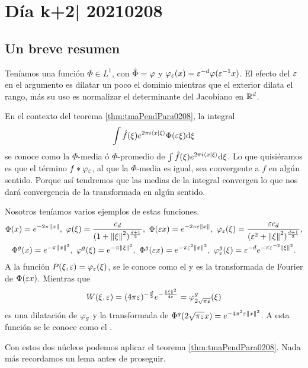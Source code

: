\documentclass[12pt]{memoir}
\begin{document}
\section{Día k+2| 20210208}

\subsection{Un breve resumen}

Teníamos una función $\Phi\in L^1$, con $\hat\Phi=\varphi$ y $\varphi_\varepsilon(x)=\varepsilon^{-d}\varphi(\varepsilon^{-1}x)$. El efecto del $\varepsilon$ en el argumento es dilatar un poco el dominio mientras que el exterior dilata el rango, más su uso es normalizar el determinante del Jacobiano en $\mathbb{R}^d$.\par 
En el contexto del teorema \ref{thm:tmaPendPara0208}, la integral 
$$\int\hat{f}(\xi) e^{2\pi i\braket{x}{\xi}}\Phi(\varepsilon\xi)\dd\xi$$
se conoce como la $\Phi$-media ó $\Phi$-promedio de $\int\hat{f}(\xi) e^{2\pi i\braket{x}{\xi}}\dd\xi$. Lo que quisiéramos es que el término $f\ast\varphi_\varepsilon$, al que la $\Phi$-media es igual, sea convergente a $f$ en algún sentido. Porque así tendremos que las medias de la integral convergen lo que nos dará convergencia de la transformada en algún sentido.

\begin{Ex}
  Nosotros teníamos varios ejemplos de estas funciones.
  \begin{gather*}
    \Phi(x)=e^{-2\pi\nm{x}},\ \vf(\xi)=\frac{c_d}{(1+\nm{\xi}^2)^{\frac{d+1}{2}}},\ \Phi(\eps x)=e^{-2\pi\eps\nm{x}},\ \vf_\eps(\xi)=\frac{\eps c_d}{(\eps^2+\nm{\xi}^2)^{\frac{d+1}{2}}},\\
    \Phi^g(x)=e^{-\pi\nm{x}^2},\ \vf^g(\xi)=e^{-\pi\nm{\xi}^2},\ \Phi^g(\eps x)=e^{-\pi\eps^2\nm{x}^2},\ \vf^g_\eps(\xi)=\eps^{-d}e^{-\pi\eps^{-2}\nm{\xi}^2}.
  \end{gather*}
  A la función $P(\xi,\varepsilon)=\varphi_\varepsilon(\xi)$, se le conoce como el  y es la transformada de Fourier de $\Phi(\varepsilon x)$. Mientras que $$W(\xi,\varepsilon)=(4\pi\varepsilon)^{-\frac d2}e^{-\frac{\left\|\xi\right\|^2}{4\varepsilon}}=\varphi_{2\sqrt{\pi\varepsilon}}^g(\xi)$$
  es una dilatación de $\varphi_g$ y la transformada de $\Phi^g(2\sqrt{\pi\varepsilon}x)=e^{-4\pi^2\varepsilon\left\|x\right\|^2}$. A esta función se le conoce como el .
\end{Ex}

Con estos dos núcleos podemos aplicar el teorema \ref{thm:tmaPendPara0208}. Nada más recordamos un lema antes de proseguir. 
\end{document}
